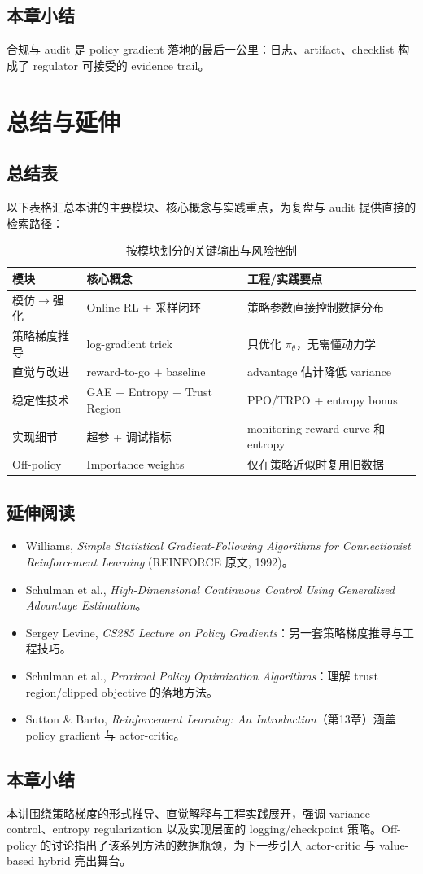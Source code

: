 \documentclass[a4paper]{article}
\begin{document}
\subsection{本章小结}
合规与 audit 是 policy gradient 落地的最后一公里：日志、artifact、checklist 构成了 regulator 可接受的 evidence trail。

\section{总结与延伸}

\subsection{总结表}
以下表格汇总本讲的主要模块、核心概念与实践重点，为复盘与 audit 提供直接的检索路径：

\begin{table}[H]
\centering
\small
\begin{tabular}{p{}p{}p{}}
\toprule
模块 & 核心概念 & 工程/实践要点 \\
\midrule
模仿\(\to\)强化 & Online RL + 采样闭环 & 策略参数直接控制数据分布 \\
策略梯度推导 & log-gradient trick & 只优化 \(\pi_\theta\)，无需懂动力学 \\
直觉与改进 & reward-to-go + baseline & advantage 估计降低 variance \\
稳定性技术 & GAE + Entropy + Trust Region & PPO/TRPO + entropy bonus \\
实现细节 & 超参 + 调试指标 & monitoring reward curve 和 entropy \\
Off-policy & Importance weights & 仅在策略近似时复用旧数据 \\
\bottomrule
\end{tabular}
\caption{按模块划分的关键输出与风险控制}
\end{table}

\subsection{延伸阅读}
\begin{itemize}
    \item Williams, \textit{Simple Statistical Gradient-Following Algorithms for Connectionist Reinforcement Learning} (REINFORCE 原文, 1992)。
    \item Schulman et al., \textit{High-Dimensional Continuous Control Using Generalized Advantage Estimation}。
    \item Sergey Levine, \textit{CS285 Lecture on Policy Gradients}：另一套策略梯度推导与工程技巧。
    \item Schulman et al., \textit{Proximal Policy Optimization Algorithms}：理解 trust region/clipped objective 的落地方法。
    \item Sutton \& Barto, \textit{Reinforcement Learning: An Introduction}（第13章）涵盖 policy gradient 与 actor-critic。
\end{itemize}

\subsection{本章小结}
本讲围绕策略梯度的形式推导、直觉解释与工程实践展开，强调 variance control、entropy regularization 以及实现层面的 logging/checkpoint 策略。Off-policy 的讨论指出了该系列方法的数据瓶颈，为下一步引入 actor-critic 与 value-based hybrid 亮出舞台。
\end{document}
